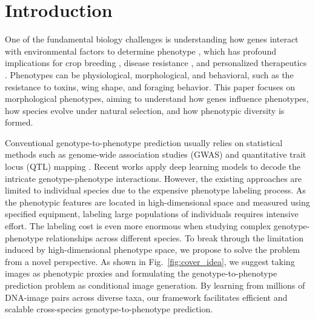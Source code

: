 \section{Introduction}
\label{sec:intro}





One of the fundamental biology challenges is understanding how genes interact with environmental factors to determine phenotype \cite{lehner2013genotype}, which has profound implications for crop breeding \cite{araus2014field,danilevicz2022plant}, disease resistance \cite{weatherall2001phenotype}, and personalized therapeutics \cite{nebert2012personalized}. Phenotypes can be physiological, morphological, and behavioral, such as the resistance to toxins, wing shape, and foraging behavior. This paper focuses on morphological phenotypes, aiming to understand how genes influence phenotypes, how species evolve under natural selection, and how phenotypic diversity is formed.





Conventional genotype-to-phenotype prediction usually relies on statistical methods such as genome-wide association studies (GWAS) \cite{uffelmann2021genome, tam2019benefits, visscher2012five,gallagher2018post,harris2024genome} and quantitative trait locus (QTL) mapping \cite{kearsey1998qtl,mccough1995qtl,korstanje2002qtl}. Recent works \cite{wang2024lstm, andreu2024phenolinker, yelmen2024interpreting,dingemans2023phenoscore} apply deep learning models to decode the intricate genotype-phenotype interactions. 
However, the existing approaches are limited to individual species due to the expensive phenotype labeling process.  As the phenotypic features are located in high-dimensional space and measured using specified equipment, labeling large populations of individuals requires intensive effort. The labeling cost is even more enormous when studying complex genotype-phenotype relationships across different species.
To break through the limitation induced by high-dimensional phenotype space, we propose to solve the problem from a novel perspective. As shown in Fig.~\ref{fig:cover_idea}, we suggest taking images as phenotypic proxies and formulating the genotype-to-phenotype prediction problem as conditional image generation. By learning from millions of DNA-image pairs across diverse taxa, our framework facilitates efficient and scalable cross-species genotype-to-phenotype prediction.


